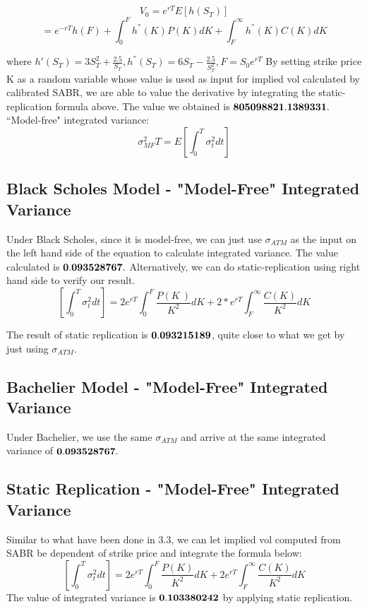 \documentclass[fleqn,12pt]{SelfArx}
\begin{document}
$$V_0=e^{rT}E\left[h(S_T)\right] $$
$$=e^{-rT}h(F)+\int_{0}^{F}h^{''}(K)P(K)dK+\int_{F}^{\infty}h^{''}(K)C(K)dK$$

\noindent where $h'(S_T)=3S_T^2+\frac{2.5}{S_T}, h^{''}(S_T)=6S_T-\frac{2.5}{S_T^2}, F=S_0e^{rT}$
By setting strike price K as a random variable whose value is used as input for implied vol calculated by calibrated SABR, we are able to value the derivative by integrating the static-replication formula above. The value we obtained is $\bf{805098821.1389331.}$\\


\noindent``Model-free" integrated variance:
$$\sigma_{MF}^2 T=E\left[\int_{0}^{T}\sigma_t^2 dt \right]$$

\subsection{Black Scholes Model - "Model-Free" Integrated Variance}
\noindent Under Black Scholes, since it is model-free, we can just use $\sigma_{ATM}$ as the input on the left hand side of the equation to calculate integrated variance. The value calculated is $\bf{0.093528767.}$ Alternatively, we can do static-replication using right hand side to verify our result.
$$\left[\int_{0}^{T}\sigma_t^2 dt\right]=2e^{rT}\int_{0}^{F}\frac{P(K\	)}{K^2}dK+2*e^{rT}\int_{F}^{\infty}\frac{C(K)}{K^2}dK$$

The result of static replication is $\bf{0.093215189}$, quite close to what we get by just using $\sigma_{ATM}$.\\

\subsection{Bachelier Model - "Model-Free" Integrated Variance}
Under Bachelier, we use the same $\sigma_{ATM}$ and arrive at the same integrated variance of $\bf{ 0.093528767}.$\\

\subsection{Static Replication - "Model-Free" Integrated Variance}
Similar to what have been done in 3.3, we can let implied vol computed from SABR be dependent of strike price and integrate the formula below:
$$\left[\int_{0}^{T}\sigma_t^2 dt\right]=2e^{rT}\int_{0}^{F}\frac{P(K)}{K^2}dK+2e^{rT}\int_{F}^{\infty}\frac{C(K)}{K^2}dK$$
The value of integrated variance is $\bf{0.103380242}$ by applying static replication.
\end{document}
